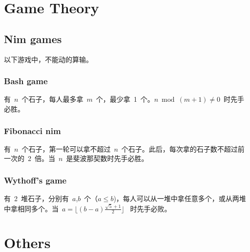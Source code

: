 \section{Game Theory}
\subsection{Nim games}
以下游戏中，不能动的算输。
\subsubsection{Bash game}
有~$n$~个石子，每人最多拿~$m$~个，最少拿~1~个。$n \bmod (m+1) \neq 0$~时先手必胜。
\subsubsection{Fibonacci nim}
有~$n$~个石子，第一轮可以拿不超过~$n$~个石子。此后，每次拿的石子数不超过前一次的~2~倍。当~$n$~是斐波那契数时先手必胜。
\subsubsection{Wythoff's game}
有~2~堆石子，分别有~$a$,$b$~个（$a \leq b$)，每人可以从一堆中拿任意多个，或从两堆中拿相同多个。当~$a = \lfloor (b-a)\frac{\sqrt{5}+1}{2} \rfloor$~ 时先手必败。



\section{Others}
